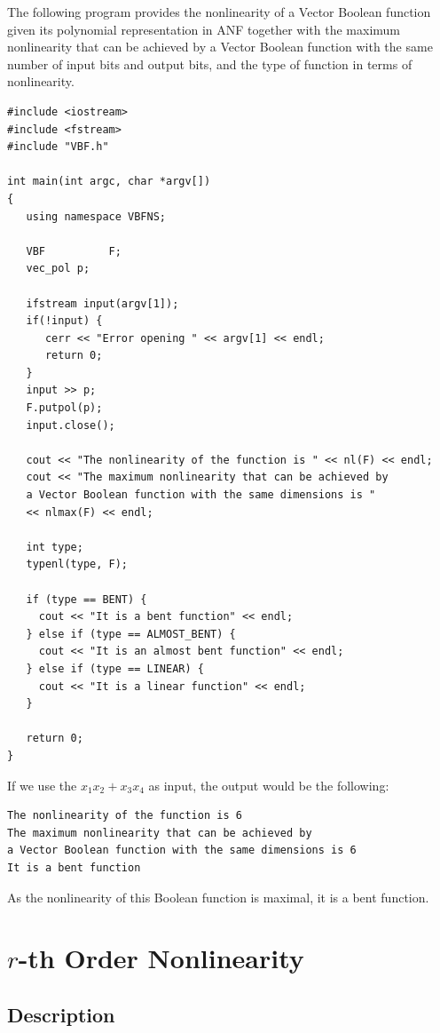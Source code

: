 \begin{example}
The following program provides the nonlinearity of a Vector Boolean function given its polynomial representation in ANF together with the maximum nonlinearity that can be achieved by a Vector Boolean function with the same number of input bits and output bits, and the type of function in terms of nonlinearity.

\begin{verbatim}
#include <iostream>
#include <fstream>
#include "VBF.h"

int main(int argc, char *argv[])
{
   using namespace VBFNS;

   VBF          F;
   vec_pol p;

   ifstream input(argv[1]);
   if(!input) {
      cerr << "Error opening " << argv[1] << endl;
      return 0;
   }
   input >> p;
   F.putpol(p);
   input.close();

   cout << "The nonlinearity of the function is " << nl(F) << endl;
   cout << "The maximum nonlinearity that can be achieved by 
   a Vector Boolean function with the same dimensions is " 
   << nlmax(F) << endl;

   int type;
   typenl(type, F);

   if (type == BENT) {
     cout << "It is a bent function" << endl;
   } else if (type == ALMOST_BENT) {
     cout << "It is an almost bent function" << endl;
   } else if (type == LINEAR) {
     cout << "It is a linear function" << endl;
   }

   return 0;
}     
\end{verbatim}

If we use the $x_1x_2+x_3x_4$ as input, the output would be the following:

\begin{verbatim}
The nonlinearity of the function is 6
The maximum nonlinearity that can be achieved by 
a Vector Boolean function with the same dimensions is 6
It is a bent function
\end{verbatim}

As the nonlinearity of this Boolean function is maximal, it is a bent function.
\end{example}

\section{$r$-th Order Nonlinearity}

\subsection{Description}


